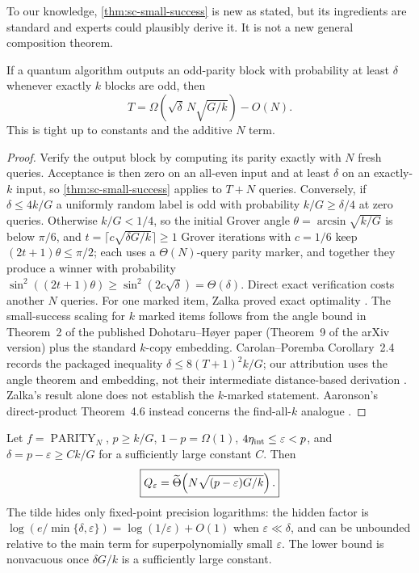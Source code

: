 To our knowledge, \cref{thm:sc-small-success} is new as stated, but its
ingredients are standard and experts could plausibly derive it.  It is not
a new general composition theorem.

\begin{corollary}
\label{cor:sc-s1}
If a quantum algorithm outputs an odd-parity block with probability at least
$\delta$ whenever exactly $k$ blocks are odd, then
\[
 T=\Omega\!\left(\sqrt\delta\,N\sqrt{G/k}\right)-O(N).
\]
This is tight up to constants and the additive $N$ term.
\end{corollary}

\begin{proof}
Verify the output block by computing its parity exactly with $N$ fresh
queries.  Acceptance is then zero on an all-even input and at least
$\delta$ on an exactly-$k$ input, so \cref{thm:sc-small-success} applies to
$T+N$ queries.  Conversely, if $\delta\le4k/G$ a uniformly random label is
odd with probability $k/G\ge\delta/4$ at zero queries.  Otherwise $k/G<1/4$,
so the initial Grover angle $\theta=\arcsin\sqrt{k/G}$ is below $\pi/6$, and
$t=\lceil c\sqrt{\delta G/k}\rceil\ge1$ Grover iterations with $c=1/6$ keep
$(2t+1)\theta\le\pi/2$; each uses a $\Theta(N)$-query parity marker, and
together they produce a winner with probability
$\sin^2((2t+1)\theta)\ge\sin^2(2c\sqrt\delta)=\Theta(\delta)$.  Direct exact
verification costs another $N$ queries.
For one marked item, Zalka proved exact optimality
\cite{zalka1999-grovers-quantum-searching-algorithm-is}.  The small-success
scaling for $k$ marked items follows from the angle bound in Theorem~2 of
the published Dohotaru--H\o yer paper (Theorem~9 of the arXiv version) plus
the standard $k$-copy embedding.
Carolan--Poremba Corollary~2.4 records the packaged inequality
$\delta\le8(T+1)^2k/G$; our attribution uses the angle theorem and embedding,
not their intermediate distance-based derivation
\cite{dohotaru2009-exact-grover,carolan2024-quantum-one-wayness}.  Zalka's
result alone does not establish the $k$-marked statement.  Aaronson's
direct-product Theorem~4.6 instead concerns the find-all-$k$ analogue
\cite{aaronson2005-limitations-quantum-advice}.
\end{proof}

\begin{corollary}
\label{cor:sc-s2}
Let $f=\operatorname{PARITY}_N$, $p\ge k/G$, $1-p=\Omega(1)$,
$4\eta_{\rm int}\le\varepsilon<p$, and $\delta=p-\varepsilon\ge Ck/G$ for a
sufficiently large constant $C$.  Then
\begin{equation}
 \boxed{Q_\varepsilon=\widetilde{\Theta}\!\left(
 N\sqrt{(p-\varepsilon)G/k}\right).}
 \label{eq:sc-full-curve}
\end{equation}
The tilde hides only fixed-point precision logarithms: the hidden factor is
$\log(e/\min\{\delta,\varepsilon\})=\log(1/\varepsilon)+O(1)$ when
$\varepsilon\ll\delta$, and can be unbounded relative to the main term for
superpolynomially small $\varepsilon$.  The lower bound is nonvacuous once
$\delta G/k$ is a sufficiently large constant.
\end{corollary}

